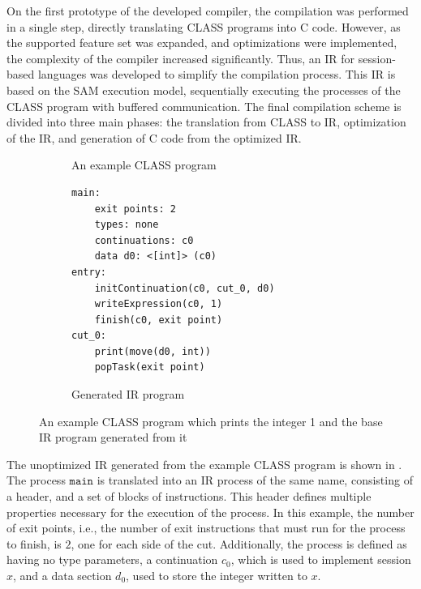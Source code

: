 On the first prototype of the developed compiler, the compilation was performed in a single step, directly translating \ac{CLASS} programs into C code. However, as the supported feature set was expanded, and optimizations were implemented, the complexity of the compiler increased significantly. Thus, an \acf{IR} for session-based languages was developed to simplify the compilation process. This \ac{IR} is based on the \ac{SAM} execution model, sequentially executing the processes of the \ac{CLASS} program with buffered communication. The final compilation scheme is divided into three main phases: the translation from \ac{CLASS} to \ac{IR}, optimization of the \ac{IR}, and generation of C code from the optimized \ac{IR}.


\begin{figure}
    \centering
    \begin{subfigure}{0.45\textwidth}
        \begin{class}
        \end{class}
        \caption{An example CLASS program}
        \label{fig:CLASSIntroExample}
    \end{subfigure}
    \hfill
    \begin{subfigure}{0.45\textwidth}
        \begin{lstlisting}[language=IR]
main:
    exit points: 2
    types: none
    continuations: c0
    data d0: <[int]> (c0)
entry:
    initContinuation(c0, cut_0, d0)
    writeExpression(c0, 1)
    finish(c0, exit point)
cut_0:
    print(move(d0, int))
    popTask(exit point)
        \end{lstlisting}
        \caption{Generated IR program}
        \label{fig:IRBaseIntroExample}
    \end{subfigure}
    \caption{An example CLASS program which prints the integer 1 and the base IR program generated from it}
\end{figure}

The unoptimized \ac{IR} generated from the example \ac{CLASS} program is shown in . The process $\texttt{main}$ is translated into an \ac{IR} process of the same name, consisting of a header, and a set of blocks of instructions. This header defines multiple properties necessary for the execution of the process. In this example, the number of exit points, i.e., the number of exit instructions that must run for the process to finish, is $2$, one for each side of the cut. Additionally, the process is defined as having no type parameters, a continuation $c_0$, which is used to implement session $x$, and a data section $d_0$, used to store the integer written to $x$.

